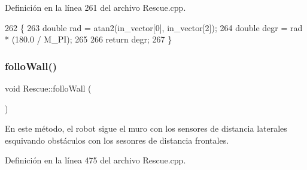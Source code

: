 Definición en la línea 261 del archivo Rescue.\+cpp.


\begin{DoxyCode}
262 \{
263     \textcolor{keywordtype}{double} rad = atan2(in\_vector[0], in\_vector[2]);
264     \textcolor{keywordtype}{double} degr = rad * (180.0 / M\_PI);
265 
266     \textcolor{keywordflow}{return} degr;
267 \}
\end{DoxyCode}
\mbox{\label{classRescue_aa9f20abea5898b53b03db91f2a323982_aa9f20abea5898b53b03db91f2a323982}} 
\subsubsection{\texorpdfstring{follo\+Wall()}{folloWall()}}
{\footnotesize\ttfamily void Rescue\+::follo\+Wall (\begin{DoxyParamCaption}{ }\end{DoxyParamCaption})}



En este método, el robot sigue el muro con los sensores de distancia laterales esquivando obstáculos con los sesonres de distancia frontales. 



Definición en la línea 475 del archivo Rescue.\+cpp.


